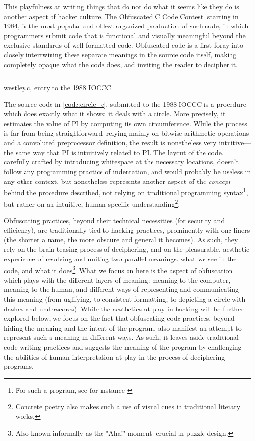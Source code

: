 This playfulness at writing things that do not do what it seems like they do is another aspect of hacker culture. The Obfuscated C Code Contest, starting in 1984, is the most popular and oldest organized production of such code, in which programmers submit code that is functional and visually meaningful beyond the exclusive standards of well-formatted code. Obfuscated code is a first foray into closely intertwining these separate meanings in the source code itself, making completely opaque what the code does, and inviting the reader to decipher it.

\begin{listing}
  \inputminted{c}{./corpus/circle.c}
  \caption{westley.c, entry to the 1988 IOCCC \citep{westley_wayback_1988}}
  \label{code:circle_c}
\end{listing}

The source code in \autoref{code:circle_c}, submitted to the 1988 IOCCC is a procedure which does exactly what it shows: it deals with a circle. More precisely, it estimates the value of PI by computing its own circumference. While the process is far from being straightforward, relying mainly on bitwise arithmetic operations and a convoluted preprocessor definition, the result is nonetheless very intuitive—the same way that PI is intuitively related to PI. The layout of the code, carefully crafted by introducing whitespace at the necessary locations, doesn't follow any programming practice of indentation, and would probably be useless in any other context, but nonetheless represents another aspect of the \emph{concept} behind the procedure described, not relying on traditional programming syntax\footnote{For such a program, see for instance \citep{lynn_pi_2004}}, but rather on an intuitive, human-specific understanding\footnote{Concrete poetry also makes such a use of visual cues in traditional literary works.}.

Obfuscating practices, beyond their technical necessities (for security and efficiency), are traditionally tied to hacking practices, prominently with one-liners (the shorter a name, the more obscure and general it becomes). As such, they rely on the brain-teasing process of deciphering, and on the pleasurable, aesthetic experience of resolving and uniting two parallel meanings: what we see in the code, and what it does\footnote{Also known informally as the "Aha!" moment, crucial in puzzle design.}. What we focus on here is the aspect of obfuscation which plays with the different layers of meaning: meaning to the computer, meaning to the human, and different ways of representing and communicating this meaning (from uglifying, to consistent formatting, to depicting a circle with dashes and underscores). While the aesthetics at play in hacking will be further explored below, we focus on the fact that obfuscating code practices, beyond hiding the meaning and the intent of the program, also manifest an attempt to represent such a meaning in different ways. As such, it leaves aside traditional code-writing practices and suggests the meaning of the program by challenging the abilities of human interpretation at play in the process of deciphering programs.

